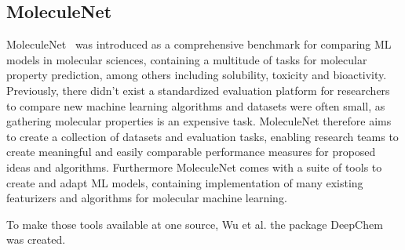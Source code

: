 \subsection{MoleculeNet}

MoleculeNet~\cite{2018moleculenet} was introduced as a comprehensive benchmark for comparing ML models in molecular sciences, containing a multitude of tasks for molecular property prediction, among others including solubility, toxicity and bioactivity. Previously, there didn't exist a standardized evaluation platform for researchers to compare new machine learning algorithms and datasets were often small, as gathering molecular properties is an expensive task. MoleculeNet therefore aims to create a collection of datasets and evaluation tasks, enabling research teams to create meaningful and easily comparable performance measures for proposed ideas and algorithms. Furthermore MoleculeNet comes with a suite of tools to create and adapt ML models, containing implementation of many existing featurizers and algorithms for molecular machine learning.

To make those tools available at one source, Wu et al. the package DeepChem~\cite{wu2023DeepChem} was created.
